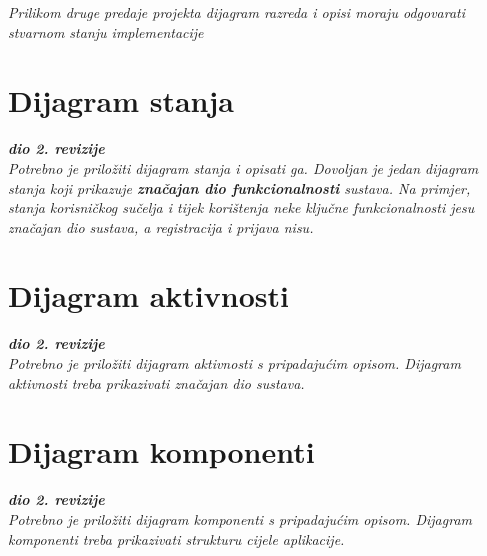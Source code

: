 			\textit{Prilikom druge predaje projekta dijagram razreda i opisi moraju odgovarati stvarnom stanju implementacije}
			
			
			
			\eject
		
		\section{Dijagram stanja}
			
			
			\textbf{\textit{dio 2. revizije}}\\
			
			\textit{Potrebno je priložiti dijagram stanja i opisati ga. Dovoljan je jedan dijagram stanja koji prikazuje \textbf{značajan dio funkcionalnosti} sustava. Na primjer, stanja korisničkog sučelja i tijek korištenja neke ključne funkcionalnosti jesu značajan dio sustava, a registracija i prijava nisu. }
			
			
			\eject 
		
		\section{Dijagram aktivnosti}
			
			\textbf{\textit{dio 2. revizije}}\\
			
			 \textit{Potrebno je priložiti dijagram aktivnosti s pripadajućim opisom. Dijagram aktivnosti treba prikazivati značajan dio sustava.}
			
			\eject
		\section{Dijagram komponenti}
		
			\textbf{\textit{dio 2. revizije}}\\
		
			 \textit{Potrebno je priložiti dijagram komponenti s pripadajućim opisom. Dijagram komponenti treba prikazivati strukturu cijele aplikacije.}
